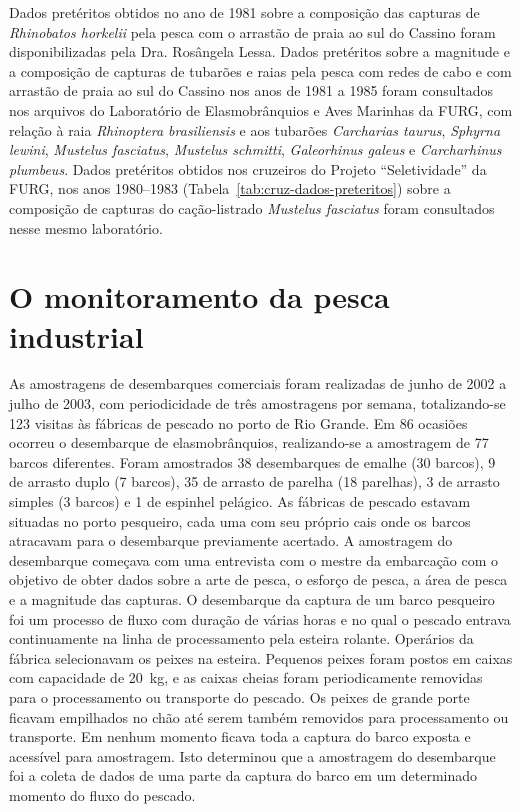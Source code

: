 \documentclass[a4paper,11pt,twoside,showtrims,onecolumn,openright,final]{memoir}
\begin{document}
Dados pretéritos obtidos no ano de 1981 sobre a composição das capturas de \emph{Rhinobatos horkelii} 
pela pesca com o arrastão de praia ao sul do Cassino foram disponibilizadas pela Dra. Rosângela Lessa. 
Dados pretéritos sobre a magnitude e a composição de capturas de tubarões e raias pela pesca com redes 
de cabo e com arrastão de praia ao sul do Cassino nos anos de 1981 a 1985 foram consultados nos arquivos 
do Laboratório de Elasmobrânquios e Aves Marinhas da FURG, com relação à raia \emph{Rhinoptera brasiliensis} 
e aos tubarões \emph{Carcharias taurus}, \emph{Sphyrna lewini}, \emph{Mustelus fasciatus}, \emph{Mustelus schmitti}, 
\emph{Galeorhinus galeus} e \emph{Carcharhinus plumbeus}. 
Dados pretéritos obtidos nos cruzeiros do Projeto ``Seletividade'' da FURG, nos anos 1980--1983 (Tabela~\ref{tab:cruz-dados-preteritos})
sobre a composição de capturas do cação-listrado \emph{Mustelus fasciatus} foram consultados 
nesse mesmo laboratório.

\section*{O monitoramento da pesca industrial} %


As amostragens de desembarques comerciais foram realizadas de junho de 2002 a julho de 2003, 
com periodicidade de três amostragens por semana, totalizando-se 123 visitas às fábricas de pescado 
no porto de Rio Grande. Em 86 ocasiões ocorreu o desembarque de elasmobrânquios, realizando-se 
a amostragem de 77  barcos diferentes. Foram amostrados 38 desembarques de emalhe (30 barcos), 
9 de arrasto duplo (7 barcos), 35 de arrasto de parelha (18 parelhas), 3 de arrasto simples (3 barcos) 
e 1 de espinhel pelágico. As fábricas de pescado estavam situadas no porto pesqueiro, cada uma com 
seu próprio cais onde os barcos atracavam para o desembarque previamente acertado. A  amostragem do 
desembarque começava com uma entrevista com o mestre da embarcação com o objetivo de obter dados sobre 
a arte de pesca, o esforço de pesca, a área de pesca e a magnitude das capturas. O desembarque da captura 
de um barco pesqueiro foi um processo de fluxo com duração de várias horas e no qual o pescado entrava 
continuamente na linha de processamento pela esteira rolante. Operários da fábrica selecionavam 
os peixes na esteira. Pequenos peixes foram postos em caixas com capacidade de 20~kg, e as caixas cheias 
foram periodicamente removidas para o processamento ou transporte do pescado. Os peixes de grande porte 
ficavam empilhados no chão até serem também removidos para processamento ou transporte. 
Em nenhum momento ficava toda a captura do barco exposta e acessível para amostragem. 
Isto determinou que a amostragem do desembarque foi a coleta de dados de uma parte da captura do barco 
em um determinado momento do fluxo do pescado.
\end{document}
